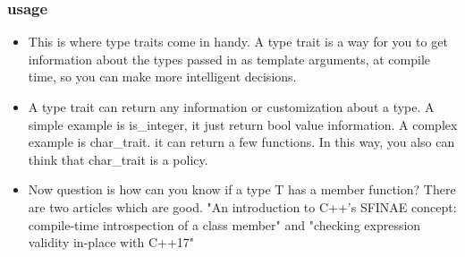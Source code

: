 \documentclass[a4paper,12pt,twoside]{book}
\begin{document}
\subsubsection{usage}
\begin{itemize}
	\item This is where type traits come in handy. A type trait is a way for you to get information about the types passed in as template arguments, at compile time, so you can make more intelligent decisions. 
	
	\item A type trait can return any information or customization about a type. A simple example is is\_integer, it just return bool value information. A complex example is char\_trait. it can return a few functions. In this way, you also can think that char\_trait is a policy. 
	
	
	
	\item Now question is how can you know if a type T has a member function? There are two articles which are good.
	"An introduction to C++'s SFINAE concept: compile-time introspection of a class member" and "checking expression validity in-place with C++17"
	
\end{itemize}
\end{document}
